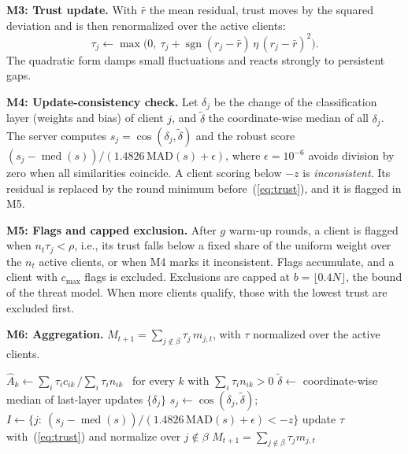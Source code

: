 \documentclass[conference]{IEEEtran}
\begin{document}
\textbf{M3: Trust update.} With $\bar r$ the mean residual, trust moves by the squared deviation and is then renormalized over the active clients:
\begin{equation}
\tau_j \leftarrow \max\!\big(0,\ \tau_j + \operatorname{sgn}(r_j-\bar r)\,\eta\,(r_j-\bar r)^2\big).
\label{eq:trust}
\end{equation}
The quadratic form damps small fluctuations and reacts strongly to persistent gaps.

\textbf{M4: Update-consistency check.} Let $\delta_j$ be the change of the classification layer (weights and bias) of client $j$, and $\tilde\delta$ the coordinate-wise median of all $\delta_j$. The server computes $s_j=\cos(\delta_j,\tilde\delta)$ and the robust score $(s_j-\operatorname{med}(s))/(1.4826\,\mathrm{MAD}(s)+\epsilon)$, where $\epsilon{=}10^{-6}$ avoids division by zero when all similarities coincide. A client scoring below $-z$ is \emph{inconsistent}. Its residual is replaced by the round minimum before~(\ref{eq:trust}), and it is flagged in M5.

\textbf{M5: Flags and capped exclusion.} After $g$ warm-up rounds, a client is flagged when $n_t\tau_j<\rho$, i.e., its trust falls below a fixed share of the uniform weight over the $n_t$ active clients, or when M4 marks it inconsistent. Flags accumulate, and a client with $c_{\max}$ flags is excluded. Exclusions are capped at $b=\lfloor0.4N\rfloor$, the bound of the threat model. When more clients qualify, those with the lowest trust are excluded first.

\textbf{M6: Aggregation.} $M_{t+1}=\sum_{j\notin\beta}\tau_j\,m_{j,t}$, with $\tau$ normalized over the active clients.

\setlength{\textfloatsep}{8pt}
\begin{algorithm}[t]
\caption{AntiFLipper: server side of round $t$}
\label{alg:af}
\small
{}
$\hat A_k\leftarrow\sum_i\tau_ic_{ik}\,/\sum_i\tau_in_{ik}$ \ for every $k$ with $\sum_i\tau_in_{ik}>0$\;
$\tilde\delta\leftarrow$ coordinate-wise median of last-layer updates $\{\delta_j\}$\;
$s_j\leftarrow\cos(\delta_j,\tilde\delta)$; \ $I\leftarrow\{j:\ (s_j-\operatorname{med}(s))/(1.4826\,\mathrm{MAD}(s)+\epsilon)<-z\}$\;
update $\tau$ with~(\ref{eq:trust}) and normalize over $j\notin\beta$\;
\Return $M_{t+1}=\sum_{j\notin\beta}\tau_j m_{j,t}$
\end{algorithm}
\end{document}

